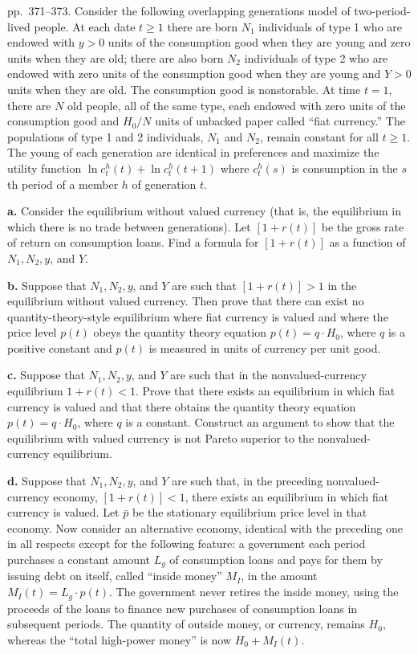 \documentclass[12pt, letterpaper]{article}
\begin{document}
\begin{tcolorbox}[evenbox,title={Exercise 9.8 \quad Inside money and real bills}]
\begin{tcolorbox}[questionbox]
pp.~371--373. Consider the following overlapping generations model of two-period-lived people. At
each date $t\ge1$ there are born $N_1$ individuals of type 1 who are endowed with $y>0$ units of the
consumption good when they are young and zero units when they are old; there are also born $N_2$
individuals of type 2 who are endowed with zero units of the consumption good when they are young
and $Y>0$ units when they are old. The consumption good is nonstorable. At time $t=1$, there are $N$
old people, all of the same type, each endowed with zero units of the consumption good and $H_0/N$
units of unbacked paper called ``fiat currency.'' The populations of type 1 and 2 individuals, $N_1$
and $N_2$, remain constant for all $t\ge1$. The young of each generation are identical in preferences
and maximize the utility function $\ln c_t^h(t)+\ln c_t^h(t+1)$ where $c_t^h(s)$ is consumption in the
$s$th period of a member $h$ of generation $t$.

\textbf{a.} Consider the equilibrium without valued currency (that is, the equilibrium in which there
is no trade between generations). Let $[1+r(t)]$ be the gross rate of return on consumption loans.
Find a formula for $[1+r(t)]$ as a function of $N_1,N_2,y$, and $Y$.

\textbf{b.} Suppose that $N_1,N_2,y$, and $Y$ are such that $[1+r(t)]>1$ in the equilibrium without
valued currency. Then prove that there can exist no quantity-theory-style equilibrium where fiat
currency is valued and where the price level $p(t)$ obeys the quantity theory equation $p(t)=q\cdot
H_0$, where $q$ is a positive constant and $p(t)$ is measured in units of currency per unit good.

\textbf{c.} Suppose that $N_1,N_2,y$, and $Y$ are such that in the nonvalued-currency equilibrium
$1+r(t)<1$. Prove that there exists an equilibrium in which fiat currency is valued and that there
obtains the quantity theory equation $p(t)=q\cdot H_0$, where $q$ is a constant. Construct an argument
to show that the equilibrium with valued currency is not Pareto superior to the nonvalued-currency
equilibrium.

\textbf{d.} Suppose that $N_1,N_2,y$, and $Y$ are such that, in the preceding nonvalued-currency
economy, $[1+r(t)]<1$, there exists an equilibrium in which fiat currency is valued. Let $\bar p$ be
the stationary equilibrium price level in that economy. Now consider an alternative economy,
identical with the preceding one in all respects except for the following feature: a government each
period purchases a constant amount $L_g$ of consumption loans and pays for them by issuing debt on
itself, called ``inside money'' $M_I$, in the amount $M_I(t)=L_g\cdot p(t)$. The government never
retires the inside money, using the proceeds of the loans to finance new purchases of consumption
loans in subsequent periods. The quantity of outside money, or currency, remains $H_0$, whereas the
``total high-power money'' is now $H_0+M_I(t)$.


\end{tcolorbox}
\end{tcolorbox}
\end{document}
